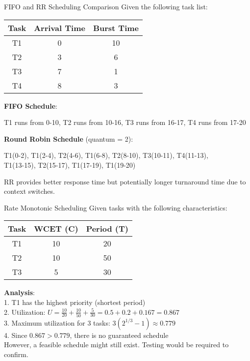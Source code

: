 \begin{example2}{FIFO and RR Scheduling Comparison}
    Given the following task list:
    
    \begin{tabular}{|c|c|c|}
        \hline
        Task & Arrival Time & Burst Time \\
        \hline
        T1 & 0 & 10 \\
        T2 & 3 & 6 \\
        T3 & 7 & 1 \\
        T4 & 8 & 3 \\
        \hline
    \end{tabular}
    
    \tcblower
    
    \textbf{FIFO Schedule}:
    
    T1 runs from 0-10, T2 runs from 10-16, T3 runs from 16-17, T4 runs from 17-20
    
    \textbf{Round Robin Schedule} (quantum = 2):
    
    T1(0-2), T1(2-4), T2(4-6), T1(6-8), T2(8-10), T3(10-11), T4(11-13), \\ T1(13-15), T2(15-17), T1(17-19), T1(19-20)
    
    RR provides better response time but potentially longer turnaround time due to context switches.
\end{example2}

\begin{example2}{Rate Monotonic Scheduling}
    Given tasks with the following characteristics:
    
    \begin{tabular}{|c|c|c|}
        \hline
        Task & WCET (C) & Period (T) \\
        \hline
        T1 & 10 & 20 \\
        T2 & 10 & 50 \\
        T3 & 5 & 30 \\
        \hline
    \end{tabular}
    
    \tcblower
    
    \textbf{Analysis}:\\
    1. T1 has the highest priority (shortest period)\\
    2. Utilization: $U = \frac{10}{20} + \frac{10}{50} + \frac{5}{30} = 0.5 + 0.2 + 0.167 = 0.867$\\
    3. Maximum utilization for 3 tasks: $3(2^{1/3} - 1) \approx 0.779$\\
    4. Since $0.867 > 0.779$, there is no guaranteed schedule\\    
    However, a feasible schedule might still exist. Testing would be required to confirm.
\end{example2}

